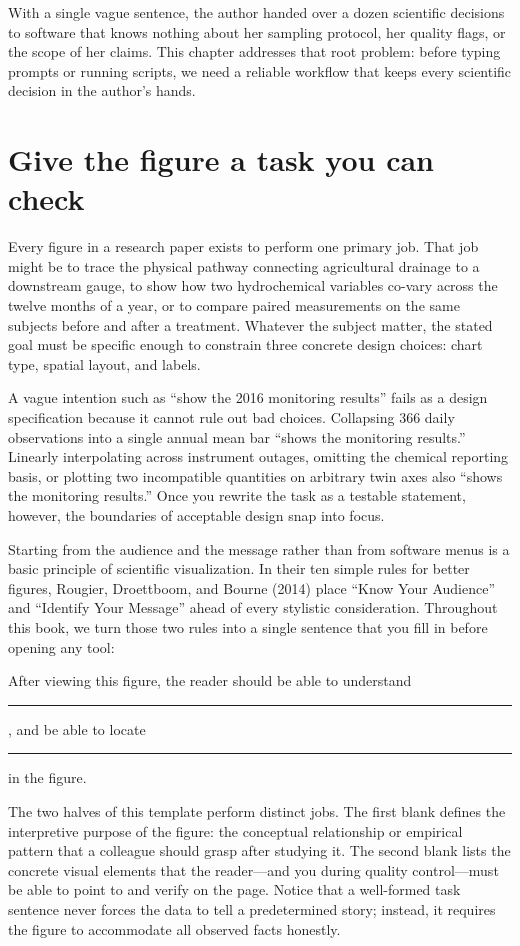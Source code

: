 With a single vague sentence, the author handed over a dozen scientific decisions to software that knows nothing about her sampling protocol, her quality flags, or the scope of her claims. This chapter addresses that root problem: before typing prompts or running scripts, we need a reliable workflow that keeps every scientific decision in the author's hands.

\section{Give the figure a task you can check}

Every figure in a research paper exists to perform one primary job. That job might be to trace the physical pathway connecting agricultural drainage to a downstream gauge, to show how two hydrochemical variables co-vary across the twelve months of a year, or to compare paired measurements on the same subjects before and after a treatment. Whatever the subject matter, the stated goal must be specific enough to constrain three concrete design choices: chart type, spatial layout, and labels.

A vague intention such as ``show the 2016 monitoring results'' fails as a design specification because it cannot rule out bad choices. Collapsing 366 daily observations into a single annual mean bar ``shows the monitoring results.'' Linearly interpolating across instrument outages, omitting the chemical reporting basis, or plotting two incompatible quantities on arbitrary twin axes also ``shows the monitoring results.'' Once you rewrite the task as a testable statement, however, the boundaries of acceptable design snap into focus.

Starting from the audience and the message rather than from software menus is a basic principle of scientific visualization. In their ten simple rules for better figures, Rougier, Droettboom, and Bourne (2014) place ``Know Your Audience'' and ``Identify Your Message'' ahead of every stylistic consideration. Throughout this book, we turn those two rules into a single sentence that you fill in before opening any tool:

\begin{BookNote}
After viewing this figure, the reader should be able to understand \rule{25mm}{0.3pt}, and be able to locate \rule{25mm}{0.3pt} in the figure.
\end{BookNote}

The two halves of this template perform distinct jobs. The first blank defines the interpretive purpose of the figure: the conceptual relationship or empirical pattern that a colleague should grasp after studying it. The second blank lists the concrete visual elements that the reader---and you during quality control---must be able to point to and verify on the page. Notice that a well-formed task sentence never forces the data to tell a predetermined story; instead, it requires the figure to accommodate all observed facts honestly.

